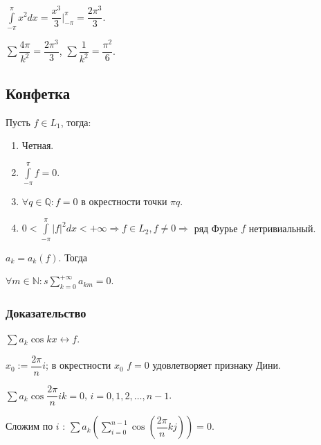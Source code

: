 \documentclass{article}
\begin{document}
            $\int\limits^{\pi}_{-\pi} x^2 dx = \dfrac{x^3}{3} \big|^{\pi}_{-\pi} = \dfrac{2 \pi^3}{3}$.
            
            $\sum \dfrac{4 \pi}{k^2} = \dfrac{2 \pi^3}{3}$, $\sum \dfrac{1}{k^2} = \dfrac{\pi^2}{6}$.
            
        \subsection{Конфетка}
        
            Пусть $f \in L_1$, тогда:
            
            \begin{enumerate}
            
                \item Четная.
                
                \item $\int\limits^{\pi}_{-\pi} f = 0$.
                
                \item $\forall q \in \mathbb{Q} : f = 0$ в окрестности точки $\pi q$.
                
                \item $0 < \int\limits^{\pi}_{-\pi} |f|^2 dx < +\infty \Rightarrow f \in L_2, f \neq 0 \Rightarrow$ ряд Фурье $f$ нетривиальный.
                
            \end{enumerate}
            
            $a_k = a_k(f)$. Тогда
            
            $\forall m \in \mathbb{N} : s\sum\limits^{+\infty}_{k = 0} a_{km} = 0$.
            
            \subsubsection{Доказательство}
            
                $\sum a_k \cos {kx} \leftrightarrow f$.
                
                $x_0 := \dfrac{2 \pi}{n} i$; в окрестности $x_0$ $f = 0$ удовлетворяет признаку Дини.
            
                $\sum a_k \cos \dfrac{2 \pi}{n} i k = 0$, $i = 0, 1, 2, \ldots, n - 1$.
                
                Сложим по $i$ : $\sum a_k \left( \sum\limits_{i = 0}^{n - 1} \cos \left( \dfrac{2 \pi}{n} k j \right) \right) = 0$.
                
\end{document}
